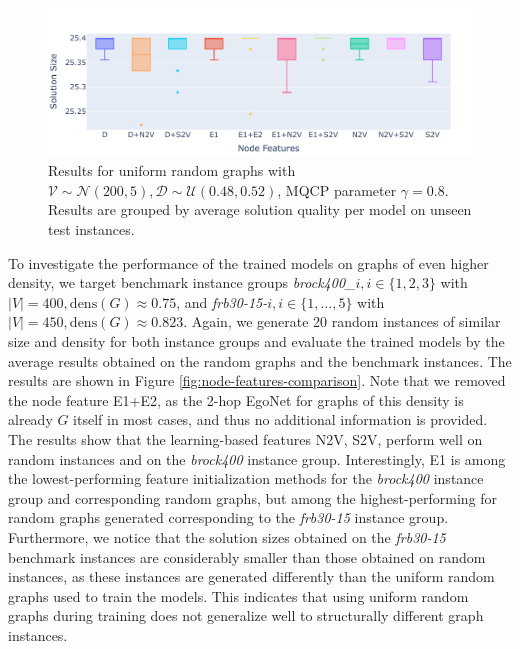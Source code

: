 \documentclass[draft,final]{vutinfth} %
\begin{document}
\begin{figure}
    \centering
    \includegraphics[width=\textwidth]{graphics/V200-048-052-random.pdf}
    \caption[]{Results for uniform random graphs with $ \mathcal{V} \sim \mathcal{N}(200, 5), \mathcal{D} \sim \mathcal{U}(0.48, 0.52)$, MQCP parameter $\gamma=0.8$. Results are grouped by average solution quality per model on unseen test instances. }
    \label{fig:V200-node-features}
\end{figure}

To investigate the performance of the trained models on graphs of even higher density, we target benchmark instance groups \emph{brock400\_}$i, i \in \{1,2,3\}$ with $|V| = 400, \mathrm{dens}(G) \approx 0.75$, and \emph{frb30-15-}$i, i \in \{1, \dots, 5\}$ with $|V| = 450, \mathrm{dens}(G) \approx 0.823$. 
Again, we generate 20 random instances of similar size and density for both instance groups and evaluate the trained models by the average results obtained on the random graphs and the benchmark instances. The results are shown in Figure \ref{fig:node-features-comparison}. 
Note that we removed the node feature E1+E2, as the 2-hop EgoNet for graphs of this density is already $G$ itself in most cases, and thus no additional information is provided. 
The results show that the learning-based features N2V, S2V, perform well on random instances and on the \emph{brock400} instance group. Interestingly, E1 is among the lowest-performing feature initialization methods for the \emph{brock400} instance group and corresponding random graphs, but among the highest-performing for random graphs generated corresponding to the \emph{frb30-15} instance group. Furthermore, we notice that the solution sizes obtained on the \emph{frb30-15} benchmark instances are considerably smaller than those obtained on random instances, as these instances are generated differently than the uniform random graphs used to train the models. This indicates that using uniform random graphs during training does not generalize well to structurally different graph instances. 
\end{document}
